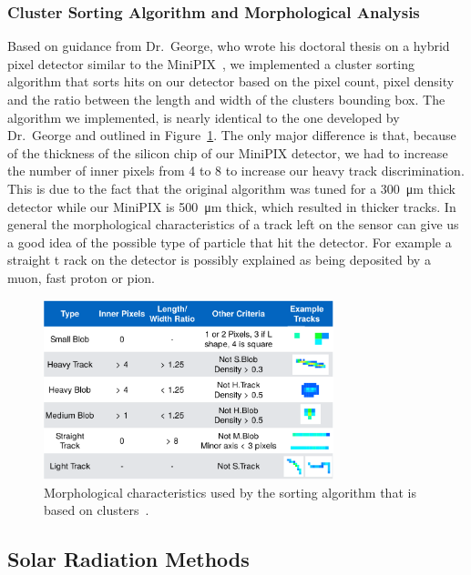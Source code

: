 {\subsubsection{Cluster Sorting Algorithm and Morphological Analysis}

Based on guidance from Dr.~George, who wrote his doctoral thesis on a hybrid pixel detector similar to the MiniPIX~\cite{stuartalgo}, we implemented a cluster sorting algorithm that sorts hits on our detector based on the pixel count, pixel density and the ratio between the length and width of the clusters bounding box. The algorithm we implemented, is nearly identical to the one developed by Dr.~George and outlined in Figure~\ref{fig:sortingalgo}. The only major difference is that, because of the thickness of the silicon chip of our MiniPIX detector, we had to increase the number of inner pixels from \num{4} to \num{8} to increase our heavy track discrimination. This is due to the fact that the original algorithm was tuned for a \SI{300}{\micro\meter} thick detector while our MiniPIX is \SI{500}{\micro\meter} thick, which resulted in thicker tracks. In general the morphological characteristics of a track left on the sensor can give us a good idea of the possible type of particle that hit the detector. For example a straight t rack on the detector is possibly explained as being deposited by a muon, fast proton or pion.

	\begin{figure}[h!]
 	\begin{center}
 	\includegraphics[width=0.75\textwidth]{./Figures/stuartgraphic.pdf}
 	\caption{Morphological characteristics used by the sorting algorithm that is based on clusters~\cite{stuartalgo}.}
 	\label{fig:sortingalgo}
 	\end{center}
 	\end{figure}
\newpage

\subsection{Solar Radiation Methods}
\label{UV Photodetector Testing}

}
